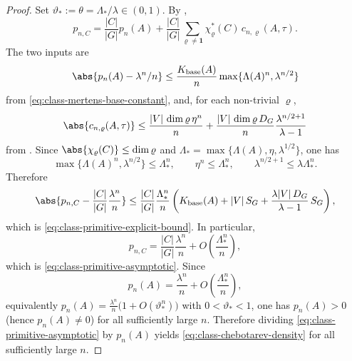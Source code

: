 \begin{proof}
  Set \(\vartheta_*:=\theta=\Lambda_*/\lambda\in(0,1)\). By
  ,
  \[
    p_{n,C}
    =
    \frac{|C|}{|G|}p_n(A)
    +\frac{|C|}{|G|}
      \sum_{\varrho\neq\mathbf 1}
        \chi_\varrho^\ast(C)\,c_{n,\varrho}(A,\tau).
  \]
  The two inputs are
  \[
    \abs{p_n(A)-\lambda^n/n}
    \le
    \frac{K_{\mathrm{base}}(A)}{n}\max\{\Lambda(A)^n,\lambda^{n/2}\}
  \]
  from \eqref{eq:class-mertens-base-constant}, and, for each
  non-trivial \(\varrho\),
  \[
    \abs{c_{n,\varrho}(A,\tau)}
    \le
    \frac{|V|\,\dim\varrho\,\eta^n}{n}
    +\frac{|V|\,\dim\varrho\,D_G}{n}
      \frac{\lambda^{n/2+1}}{\lambda-1}
  \]
  from . Since
  \(\abs{\chi_\varrho(C)}\le \dim\varrho\) and
  \(\Lambda_*=\max\{\Lambda(A),\eta,\lambda^{1/2}\}\), one has
  \[
    \max\{\Lambda(A)^n,\lambda^{n/2}\}\le \Lambda_*^n,
    \qquad
    \eta^n\le \Lambda_*^n,
    \qquad
    \lambda^{n/2+1}\le \lambda\Lambda_*^n.
  \]
  Therefore
  \[
    \abs{
      p_{n,C}
      -\frac{|C|}{|G|}\frac{\lambda^n}{n}
    }
    \le
    \frac{|C|}{|G|}
    \frac{\Lambda_*^n}{n}
    \left(
      K_{\mathrm{base}}(A)
      +|V|\,S_G
      +\frac{\lambda |V|\,D_G}{\lambda-1}\,S_G
    \right),
  \]
  which is \eqref{eq:class-primitive-explicit-bound}. In particular,
  \[
    p_{n,C}
    =
    \frac{|C|}{|G|}\frac{\lambda^n}{n}
    +O\!\left(\frac{\Lambda_*^n}{n}\right),
  \]
  which is \eqref{eq:class-primitive-asymptotic}.
  Since
  \[
    p_n(A)=\frac{\lambda^n}{n}+O\!\left(\frac{\Lambda_*^n}{n}\right),
  \]
  equivalently
  \(p_n(A)=\frac{\lambda^n}{n}\bigl(1+O(\vartheta_*^n)\bigr)\) with
  \(0<\vartheta_*<1\), one has \(p_n(A)>0\) (hence \(p_n(A)\neq 0\))
  for all sufficiently large \(n\). Therefore
  dividing \eqref{eq:class-primitive-asymptotic} by \(p_n(A)\) yields
  \eqref{eq:class-chebotarev-density} for all sufficiently large \(n\).


\end{proof}
